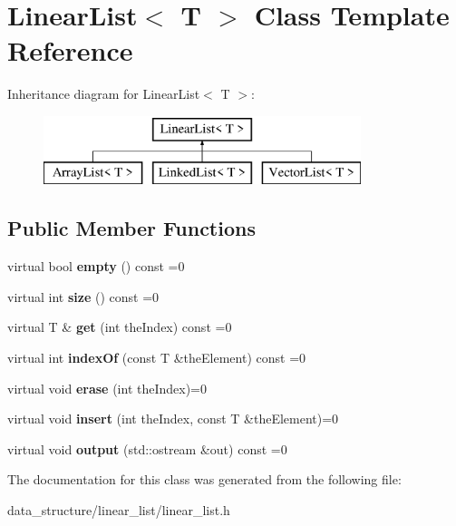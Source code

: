 \hypertarget{classLinearList}{}\section{Linear\+List$<$ T $>$ Class Template Reference}
\label{classLinearList}
Inheritance diagram for Linear\+List$<$ T $>$\+:\begin{figure}[H]
\begin{center}
\leavevmode
\includegraphics[height=2.000000cm]{classLinearList}
\end{center}
\end{figure}
\subsection*{Public Member Functions}
\begin{DoxyCompactItemize}
\item 
\mbox{\label{classLinearList_ad7ddf5d1f6625f9c2c92f2fa12e46dbd}} 
virtual bool {\bfseries empty} () const =0
\item 
\mbox{\label{classLinearList_a8db72437c90cd51fca0a72ad737a58e8}} 
virtual int {\bfseries size} () const =0
\item 
\mbox{\label{classLinearList_add1333f53468ffeb7274e660cf524f64}} 
virtual T \& {\bfseries get} (int the\+Index) const =0
\item 
\mbox{\label{classLinearList_a73f1f5c7bb9cee830393bb29c7b4b934}} 
virtual int {\bfseries index\+Of} (const T \&the\+Element) const =0
\item 
\mbox{\label{classLinearList_a11b88599d63152661e6a8c17b518102e}} 
virtual void {\bfseries erase} (int the\+Index)=0
\item 
\mbox{\label{classLinearList_a5fbe118bc2462a56f882bfaf9572627a}} 
virtual void {\bfseries insert} (int the\+Index, const T \&the\+Element)=0
\item 
\mbox{\label{classLinearList_a33a29cad0a20f500dd8da6dc64a7b565}} 
virtual void {\bfseries output} (std\+::ostream \&out) const =0
\end{DoxyCompactItemize}


The documentation for this class was generated from the following file\+:\begin{DoxyCompactItemize}
\item 
data\+\_\+structure/linear\+\_\+list/linear\+\_\+list.\+h\end{DoxyCompactItemize}
